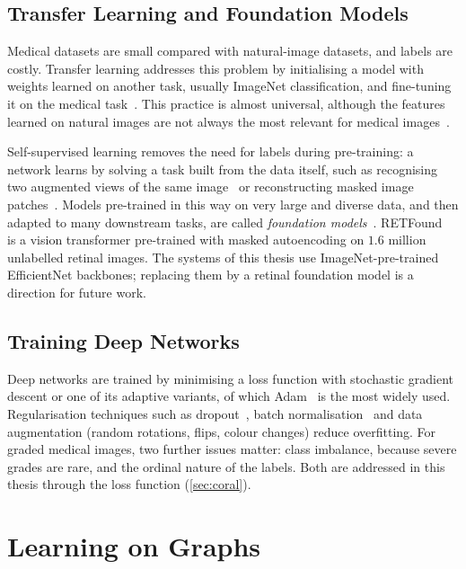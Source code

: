 \subsection{Transfer Learning and Foundation Models}

Medical datasets are small compared with natural-image datasets, and labels are costly.
Transfer learning addresses this problem by initialising a model with weights learned on
another task, usually ImageNet classification, and fine-tuning it on the medical
task~\cite{pan2010transfer}. This practice is almost universal, although the features
learned on natural images are not always the most relevant for medical
images~\cite{raghu2019transfusion}.

Self-supervised learning removes the need for labels during pre-training: a network learns
by solving a task built from the data itself, such as recognising two augmented views of
the same image~\cite{chen2020simclr} or reconstructing masked image patches~\cite{he2022mae}.
Models pre-trained in this way on very large and diverse data, and then adapted to many
downstream tasks, are called \emph{foundation models}~\cite{bommasani2021foundation}.
RETFound~\cite{zhou2023retfound} is a vision transformer pre-trained with masked
autoencoding on $1.6$ million unlabelled retinal images. The systems of this thesis use
ImageNet-pre-trained EfficientNet backbones; replacing them by a retinal foundation model
is a direction for future work.

\subsection{Training Deep Networks}

Deep networks are trained by minimising a loss function with stochastic gradient descent
or one of its adaptive variants, of which Adam~\cite{kingma2015adam} is the most widely
used. Regularisation techniques such as dropout~\cite{srivastava2014dropout}, batch
normalisation~\cite{ioffe2015batchnorm} and data augmentation (random rotations, flips,
colour changes) reduce overfitting. For graded medical images, two further issues matter:
class imbalance, because severe grades are rare, and the ordinal nature of the labels.
Both are addressed in this thesis through the loss function (\cref{sec:coral}).

\section{Learning on Graphs}
\label{sec:graphs}

